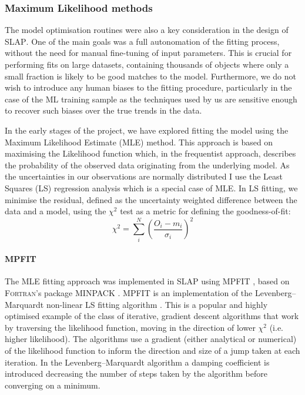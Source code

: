 \subsubsection{Maximum Likelihood methods}
The model optimisation routines were also a key consideration in the design of \textsc{SLAP}. One of the main goals was a full autonomation of the fitting process, without the need for manual fine-tuning of input parameters. This is crucial for performing fits on large datasets, containing thousands of objects where only a small fraction is likely to be good matches to the model. Furthermore, we do not wish to introduce any human biases to the fitting procedure, particularly in the case of the ML training sample as the techniques used by us are sensitive enough to recover such biases over the true trends in the data.

In the early stages of the project, we have explored fitting the model using the Maximum Likelihood Estimate (MLE) method. This approach is based on maximising the Likelihood function which, in the frequentist approach, describes the probability of the observed data originating from the underlying model. As the uncertainties in our observations are normally distributed I use the Least Squares (LS) regression analysis which is a special case of MLE. In LS fitting, we minimise the residual, defined as the uncertainty weighted difference between the data and a model, using the $\chi^{2}$ test as a metric for defining the goodness-of-fit:
\begin{equation}
  \chi^2 = \sum\limits_i^N \left( \frac{O_i - m_i}{\sigma_i} \right)^2
\end{equation}

\paragraph{MPFIT} \label{sec:MPFIT}
The MLE fitting approach was implemented in \textsc{SLAP} using \textsc{MPFIT} \citep{ Markwardt2008}, based on \textsc{Fortran}'s package \textsc{MINPACK} \citep{More1980}. \textsc{MPFIT} is an implementation of the Levenberg–Marquardt non-linear LS fitting algorithm \citep{Levenberg1944,Marquardt1963}. This is a popular and highly optimised example of the class of iterative, gradient descent algorithms that work by traversing the likelihood function, moving in the direction of lower $\chi^2$ (i.e. higher likelihood). The algorithms use a gradient (either analytical or numerical) of the likelihood function to inform the direction and size of a jump taken at each iteration. In the Levenberg–Marquardt algorithm a damping coefficient is introduced decreasing the number of steps taken by the algorithm before converging on a minimum.

